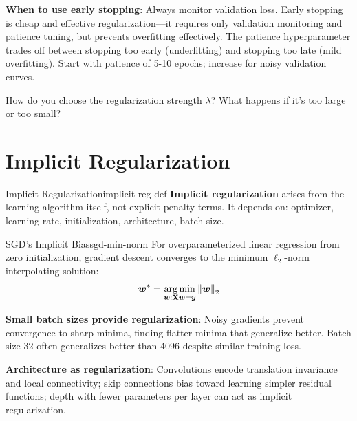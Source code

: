 \documentclass[../../main.tex]{subfiles}
\begin{document}
\begin{keyconcept}
\textbf{When to use early stopping}: Always monitor validation loss. Early stopping is cheap and effective regularization---it requires only validation monitoring and patience tuning, but prevents overfitting effectively. The patience hyperparameter trades off between stopping too early (underfitting) and stopping too late (mild overfitting). Start with patience of 5-10 epochs; increase for noisy validation curves.
\end{keyconcept}

\begin{checkpoint}
How do you choose the regularization strength $\lambda$? What happens if it's too large or too small?
\end{checkpoint}

\section{Implicit Regularization}
\label{sec:implicit-regularization}

\begin{definition}{Implicit Regularization}{implicit-reg-def}
\textbf{Implicit regularization} arises from the learning algorithm itself, not explicit penalty terms. It depends on: optimizer, learning rate, initialization, architecture, batch size.
\end{definition}

\begin{theorem}{SGD's Implicit Bias}{sgd-min-norm}
For overparameterized linear regression from zero initialization, gradient descent converges to the minimum $\ell_2$-norm interpolating solution:
\[
    \boldsymbol{w}^* = \operatorname*{arg\,min}_{\boldsymbol{w}: \mathbf{X}\boldsymbol{w}=\boldsymbol{y}} \left\lVert \boldsymbol{w} \right\rVert_2
\]
\end{theorem}

\begin{important}
\textbf{Small batch sizes provide regularization}: Noisy gradients prevent convergence to sharp minima, finding flatter minima that generalize better. Batch size 32 often generalizes better than 4096 despite similar training loss.
\end{important}

\textbf{Architecture as regularization}: Convolutions encode translation invariance and local connectivity; skip connections bias toward learning simpler residual functions; depth with fewer parameters per layer can act as implicit regularization.
\end{document}
